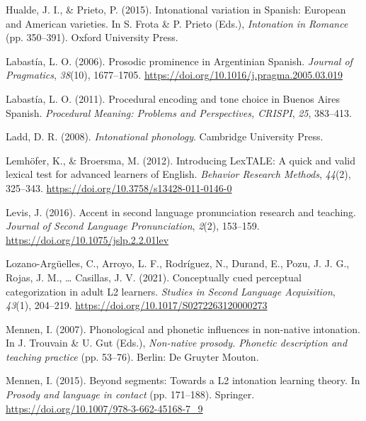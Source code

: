 \documentclass[]{article}
\newlength{\cslhangindent}
\newenvironment{CSLReferences}[2] %
 {%
  \setlength{\parindent}{0pt}
  \ifodd #1 \everypar{\setlength{\hangindent}{\cslhangindent}}\ignorespaces\fi
  \ifnum #2 > 0
  \setlength{\parskip}{#2\baselineskip}
  \fi
 }%
 {}
\begin{document}
\begin{CSLReferences}{1}{0}
\leavevmode{}%
Hualde, J. I., \& Prieto, P. (2015). Intonational variation in {S}panish: {E}uropean and {A}merican varieties. In S. Frota \& P. Prieto (Eds.), \emph{Intonation in {R}omance} (pp. 350--391). Oxford University Press.

\leavevmode{}%
Labastía, L. O. (2006). Prosodic prominence in {A}rgentinian {S}panish. \emph{Journal of Pragmatics}, \emph{38}(10), 1677--1705. \url{https://doi.org/10.1016/j.pragma.2005.03.019}

\leavevmode{}%
Labastía, L. O. (2011). Procedural encoding and tone choice in {Buenos Aires Spanish}. \emph{Procedural Meaning: Problems and Perspectives, CRISPI}, \emph{25}, 383--413.

\leavevmode{}%
Ladd, D. R. (2008). \emph{Intonational phonology}. Cambridge University Press.

\leavevmode{}%
Lemhöfer, K., \& Broersma, M. (2012). Introducing LexTALE: A quick and valid lexical test for advanced learners of {E}nglish. \emph{Behavior Research Methods}, \emph{44}(2), 325--343. \url{https://doi.org/10.3758/s13428-011-0146-0}

\leavevmode{}%
Levis, J. (2016). Accent in second language pronunciation research and teaching. \emph{Journal of Second Language Pronunciation}, \emph{2}(2), 153--159. \url{https://doi.org/10.1075/jslp.2.2.01lev}

\leavevmode{}%
Lozano-Argüelles, C., Arroyo, L. F., Rodríguez, N., Durand, E., Pozu, J. J. G., Rojas, J. M., \ldots{} Casillas, J. V. (2021). Conceptually cued perceptual categorization in adult {L}2 learners. \emph{Studies in Second Language Acquisition}, \emph{43}(1), 204--219. \url{https://doi.org/10.1017/S0272263120000273}

\leavevmode{}%
Mennen, I. (2007). Phonological and phonetic influences in non-native intonation. In J. Trouvain \& U. Gut (Eds.), \emph{Non-native prosody. Phonetic description and teaching practice} (pp. 53--76). Berlin: De Gruyter Mouton.

\leavevmode{}%
Mennen, I. (2015). Beyond segments: {T}owards a {L}2 intonation learning theory. In \emph{Prosody and language in contact} (pp. 171--188). Springer. \url{https://doi.org/10.1007/978-3-662-45168-7_9}


\end{CSLReferences}
\end{document}
